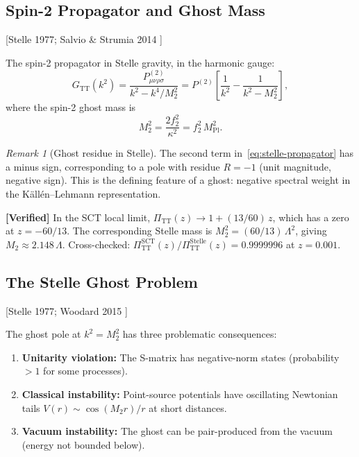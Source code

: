 \documentclass[11pt,a4paper]{article}
\theoremstyle{plain}
\theoremstyle{definition}
\theoremstyle{remark}
\newtheorem{remark}[theorem]{Remark}
\newcommand{\PiTT}{\Pi_{\mathrm{TT}}}
\newcommand{\MPl}{M_{\mathrm{Pl}}}
\newcommand{\fromlit}[1]{\textcolor{blue!70!black}{\textsf{[#1]}}}
\newcommand{\verified}[1]{%
  \par\smallskip\noindent
  \colorbox{green!10}{\parbox{\dimexpr\linewidth-2\fboxsep}{%
    \textcolor{green!50!black}{\textbf{[Verified]}} #1}}%
  \par\smallskip}
\begin{document}
\subsection{Spin-2 Propagator and Ghost Mass}

\fromlit{Stelle 1977; Salvio \& Strumia 2014 \cite{SalvioStrumia2014}}

The spin-2 propagator in Stelle gravity, in the harmonic gauge:
\begin{equation}\label{eq:stelle-propagator}
  G_{\mathrm{TT}}(k^2)
  = \frac{P^{(2)}_{\mu\nu\rho\sigma}}{k^2 - k^4/M_2^2}
  = P^{(2)}\!\left[\frac{1}{k^2} - \frac{1}{k^2 - M_2^2}\right],
\end{equation}
where the spin-2 ghost mass is
\begin{equation}\label{eq:stelle-mass}
  M_2^2 = \frac{2f_2^2}{\kappa^2} = f_2^2\,\MPl^2.
\end{equation}

\begin{remark}[Ghost residue in Stelle]
\label{rem:stelle-residue}
The second term in~\eqref{eq:stelle-propagator} has a minus sign,
corresponding to a pole with residue $R = -1$ (unit magnitude, negative
sign).  This is the defining feature of a ghost: negative spectral weight
in the K\"all\'en--Lehmann representation.
\end{remark}

\verified{In the SCT local limit, $\PiTT(z) \to 1 + (13/60)\,z$, which
has a zero at $z = -60/13$.  The corresponding Stelle mass is
$M_2^2 = (60/13)\,\Lambda^2$, giving $M_2 \approx 2.148\,\Lambda$.
Cross-checked: $\PiTT^{\mathrm{SCT}}(z)/\PiTT^{\mathrm{Stelle}}(z)
= 0.9999996$ at $z = 0.001$.}

\subsection{The Stelle Ghost Problem}

\fromlit{Stelle 1977; Woodard 2015 \cite{Woodard2015}}

The ghost pole at $k^2 = M_2^2$ has three problematic consequences:
\begin{enumerate}[nosep]
  \item \textbf{Unitarity violation:} The S-matrix has negative-norm
    states (probability $> 1$ for some processes).
  \item \textbf{Classical instability:} Point-source potentials have
    oscillating Newtonian tails $V(r) \sim \cos(M_2 r)/r$ at short
    distances.
  \item \textbf{Vacuum instability:} The ghost can be pair-produced
    from the vacuum (energy not bounded below).
\end{enumerate}
\end{document}
